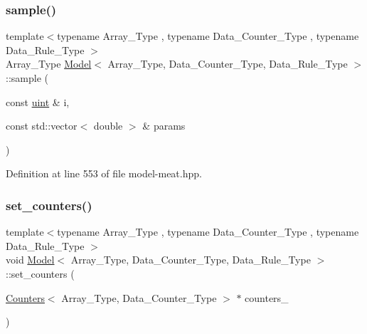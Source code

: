 \mbox{\label{class_model_a7fb66a67707f610b70ee05b814373f49}} 
\subsubsection{\texorpdfstring{sample()}{sample()}\hspace{0.1cm}{\footnotesize\ttfamily [2/2]}}
{\footnotesize\ttfamily template$<$typename Array\+\_\+\+Type , typename Data\+\_\+\+Counter\+\_\+\+Type , typename Data\+\_\+\+Rule\+\_\+\+Type $>$ \\
Array\+\_\+\+Type \hyperlink{class_model}{Model}$<$ Array\+\_\+\+Type, Data\+\_\+\+Counter\+\_\+\+Type, Data\+\_\+\+Rule\+\_\+\+Type $>$\+::sample (\begin{DoxyParamCaption}\item[{const \hyperlink{typedefs_8hpp_a91ad9478d81a7aaf2593e8d9c3d06a14}{uint} \&}]{i,  }\item[{const std\+::vector$<$ double $>$ \&}]{params }\end{DoxyParamCaption})\hspace{0.3cm}{\ttfamily [inline]}}



Definition at line 553 of file model-\/meat.\+hpp.

\mbox{\label{class_model_aab2ba8c90b888cfa2143bccf42fcb89f}} 
\subsubsection{\texorpdfstring{set\+\_\+counters()}{set\_counters()}}
{\footnotesize\ttfamily template$<$typename Array\+\_\+\+Type , typename Data\+\_\+\+Counter\+\_\+\+Type , typename Data\+\_\+\+Rule\+\_\+\+Type $>$ \\
void \hyperlink{class_model}{Model}$<$ Array\+\_\+\+Type, Data\+\_\+\+Counter\+\_\+\+Type, Data\+\_\+\+Rule\+\_\+\+Type $>$\+::set\+\_\+counters (\begin{DoxyParamCaption}\item[{\hyperlink{class_counters}{Counters}$<$ Array\+\_\+\+Type, Data\+\_\+\+Counter\+\_\+\+Type $>$ $\ast$}]{counters\+\_\+ }\end{DoxyParamCaption})\hspace{0.3cm}{\ttfamily [inline]}}



